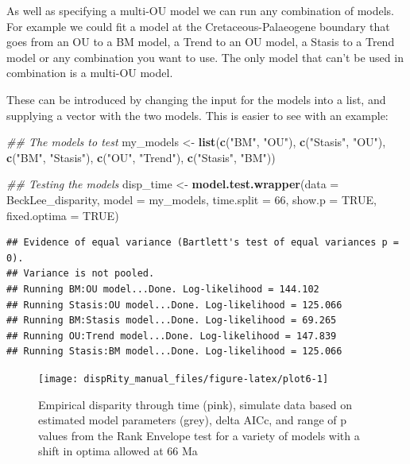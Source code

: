 \documentclass[
]{book}
\newenvironment{Shaded}{\begin{snugshade}}{\end{snugshade}}
\newcommand{\CommentTok}[1]{\textcolor[rgb]{0.56,0.35,0.01}{\textit{#1}}}
\newcommand{\DataTypeTok}[1]{\textcolor[rgb]{0.13,0.29,0.53}{#1}}
\newcommand{\DecValTok}[1]{\textcolor[rgb]{0.00,0.00,0.81}{#1}}
\newcommand{\KeywordTok}[1]{\textcolor[rgb]{0.13,0.29,0.53}{\textbf{#1}}}
\newcommand{\NormalTok}[1]{#1}
\newcommand{\OtherTok}[1]{\textcolor[rgb]{0.56,0.35,0.01}{#1}}
\newcommand{\StringTok}[1]{\textcolor[rgb]{0.31,0.60,0.02}{#1}}
\begin{document}
As well as specifying a multi-OU model we can run any combination of models.
For example we could fit a model at the Cretaceous-Palaeogene boundary that goes from an OU to a BM model, a Trend to an OU model, a Stasis to a Trend model or any combination you want to use.
The only model that can't be used in combination is a multi-OU model.

These can be introduced by changing the input for the models into a list, and supplying a vector with the two models.
This is easier to see with an example:

\begin{Shaded}
\begin{Highlighting}[]
\CommentTok{\#\# The models to test}
\NormalTok{my\_models \textless{}{-}}\StringTok{ }\KeywordTok{list}\NormalTok{(}\KeywordTok{c}\NormalTok{(}\StringTok{"BM"}\NormalTok{, }\StringTok{"OU"}\NormalTok{),}
                  \KeywordTok{c}\NormalTok{(}\StringTok{"Stasis"}\NormalTok{, }\StringTok{"OU"}\NormalTok{),}
                  \KeywordTok{c}\NormalTok{(}\StringTok{"BM"}\NormalTok{, }\StringTok{"Stasis"}\NormalTok{),}
                  \KeywordTok{c}\NormalTok{(}\StringTok{"OU"}\NormalTok{, }\StringTok{"Trend"}\NormalTok{),}
                  \KeywordTok{c}\NormalTok{(}\StringTok{"Stasis"}\NormalTok{, }\StringTok{"BM"}\NormalTok{))}

\CommentTok{\#\# Testing the models}
\NormalTok{disp\_time \textless{}{-}}\StringTok{ }\KeywordTok{model.test.wrapper}\NormalTok{(}\DataTypeTok{data =}\NormalTok{ BeckLee\_disparity,}
                                \DataTypeTok{model =}\NormalTok{ my\_models, }\DataTypeTok{time.split =} \DecValTok{66}\NormalTok{,}
                                \DataTypeTok{show.p =} \OtherTok{TRUE}\NormalTok{, }\DataTypeTok{fixed.optima =} \OtherTok{TRUE}\NormalTok{)}
\end{Highlighting}
\end{Shaded}

\begin{verbatim}
## Evidence of equal variance (Bartlett's test of equal variances p = 0).
## Variance is not pooled.
## Running BM:OU model...Done. Log-likelihood = 144.102
## Running Stasis:OU model...Done. Log-likelihood = 125.066
## Running BM:Stasis model...Done. Log-likelihood = 69.265
## Running OU:Trend model...Done. Log-likelihood = 147.839
## Running Stasis:BM model...Done. Log-likelihood = 125.066
\end{verbatim}

\begin{figure}

{\centering \texttt{[image: dispRity\_manual\_files/figure-latex/plot6-1]} 

}

\caption{Empirical disparity through time (pink), simulate data based on estimated model parameters (grey), delta AICc, and range of p values from the Rank Envelope test for a variety of models with a shift in optima allowed at 66 Ma}\label{fig:plot6}
\end{figure}
\end{document}
